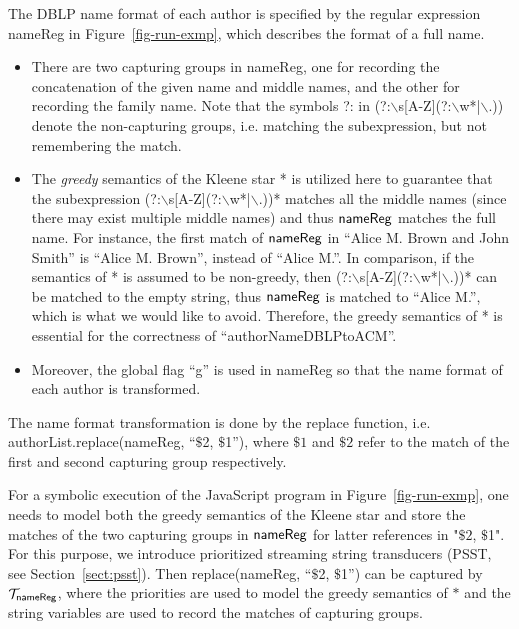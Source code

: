 The DBLP name format of each author is specified by the regular expression {\sf nameReg}  in Figure~\ref{fig-run-exmp}, which describes the format of a full name.
\begin{itemize}
\item There are two capturing groups in {\sf nameReg}, one for recording the concatenation of the given name and middle names, and the other for recording the family name. 
Note that the symbols ?: in (?:$\backslash$s[A-Z](?:$\backslash$w*|$\backslash$.)) denote the non-capturing groups, i.e. matching the subexpression, but not remembering the match.
%
\item The \emph{greedy} semantics of the Kleene star * is utilized here to guarantee that the subexpression (?:$\backslash$s[A-Z](?:$\backslash$w*|$\backslash$.))* matches all the middle names (since there may exist multiple middle names) and thus ${\sf nameReg}$ matches the full name. For instance, the first match of ${\sf nameReg}$ in  ``Alice M. Brown and John Smith'' is ``Alice M. Brown'', instead of ``Alice M.''. In comparison, if the semantics of * is assumed to be non-greedy, then (?:$\backslash$s[A-Z](?:$\backslash$w*|$\backslash$.))* can be matched to the empty string, thus ${\sf nameReg}$ is matched to ``Alice M.'', which is what we would like to avoid. Therefore, the greedy semantics of * is essential for the correctness of ``authorNameDBLPtoACM''.
%
\item Moreover, the global flag ``g'' is used in {\sf nameReg} so that the name format of each author is transformed. 
\end{itemize}
The name format transformation is done by the {\sf replace} function, i.e. {\sf authorList.replace(nameReg, ``$\$$2, $\$$1'')}, where $\$1$ and $\$2$ refer to the match of the first and second capturing group respectively. 

For a symbolic execution of the JavaScript program in Figure~\ref{fig-run-exmp}, one needs to model both the greedy semantics of the Kleene star and store the matches of the two capturing groups in ${\sf nameReg}$ for latter references in "$\$2$, $\$$1". For this purpose, we introduce prioritized streaming string transducers (PSST, see Section~\ref{sect:psst}). Then {\sf replace(nameReg, ``$\$$2, $\$$1'')} can be captured by $\mathcal{T}_{\sf nameReg}$, where the priorities are used to model the greedy semantics of $*$ and the string variables are used to record the matches of capturing groups.

